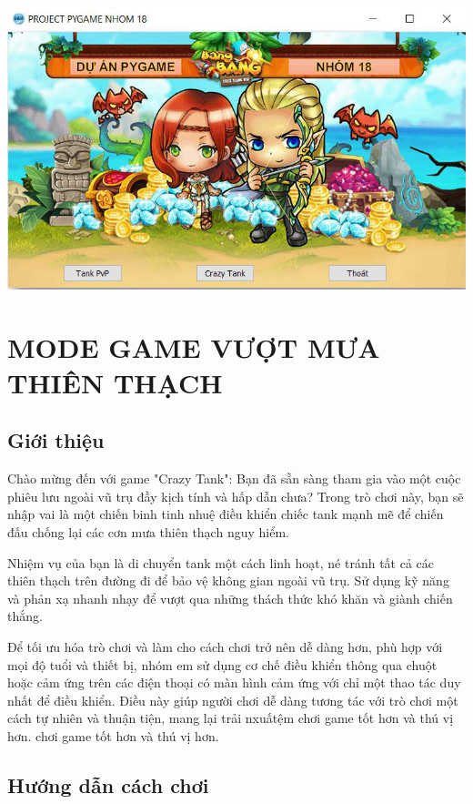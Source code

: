 \documentclass[a4paper]{article}
\begin{document}
\includegraphics[width=5.25in,height=3.22778in]{image4.png}

\newpage
\section{MODE GAME VƯỢT MƯA THIÊN THẠCH}
\subsection{Giới thiệu}\vspace{1em}
Chào mừng đến với game "Crazy Tank":
Bạn đã sẵn sàng tham gia vào một cuộc phiêu lưu ngoài vũ trụ đầy kịch
tính và hấp dẫn chưa? Trong trò chơi này, bạn sẽ nhập vai là một chiến
binh tinh nhuệ điều khiển chiếc tank mạnh mẽ để chiến đấu chống lại các
cơn mưa thiên thạch nguy hiểm.

Nhiệm vụ của bạn là di chuyển tank một cách linh hoạt, né tránh tất cả
các thiên thạch trên đường đi để bảo vệ không gian ngoài vũ trụ. Sử dụng
kỹ năng và phản xạ nhanh nhạy để vượt qua những thách thức khó khăn và
giành chiến thắng.

Để tối ưu hóa trò chơi và làm cho cách chơi trở nên dễ dàng hơn, phù hợp
với mọi độ tuổi và thiết bị, nhóm em sử dụng cơ chế điều khiển thông qua
chuột hoặc cảm ứng trên các điện thoại có màn hình cảm ứng với chỉ một
thao tác duy nhất để điều khiển. Điều này giúp người chơi dễ dàng tương
tác với trò chơi một cách tự nhiên và thuận tiện, mang lại trải nxuấtệm
chơi game tốt hơn và thú vị hơn.
chơi game tốt hơn và thú vị hơn.

\subsection{Hướng dẫn cách chơi}
\end{document}
